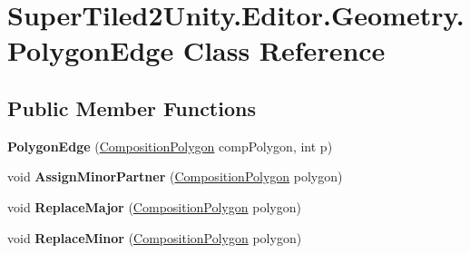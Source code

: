 \hypertarget{class_super_tiled2_unity_1_1_editor_1_1_geometry_1_1_polygon_edge}{}\section{Super\+Tiled2\+Unity.\+Editor.\+Geometry.\+Polygon\+Edge Class Reference}
\label{class_super_tiled2_unity_1_1_editor_1_1_geometry_1_1_polygon_edge}
\subsection*{Public Member Functions}
\begin{DoxyCompactItemize}
\item 
\mbox{\label{class_super_tiled2_unity_1_1_editor_1_1_geometry_1_1_polygon_edge_ad3e2a4794f2c58361280a1388a262e15}} 
{\bfseries Polygon\+Edge} (\mbox{\hyperlink{class_super_tiled2_unity_1_1_editor_1_1_geometry_1_1_composition_polygon}{Composition\+Polygon}} comp\+Polygon, int p)
\item 
\mbox{\label{class_super_tiled2_unity_1_1_editor_1_1_geometry_1_1_polygon_edge_a9852e004d9b1d5e84a38a2efadf34052}} 
void {\bfseries Assign\+Minor\+Partner} (\mbox{\hyperlink{class_super_tiled2_unity_1_1_editor_1_1_geometry_1_1_composition_polygon}{Composition\+Polygon}} polygon)
\item 
\mbox{\label{class_super_tiled2_unity_1_1_editor_1_1_geometry_1_1_polygon_edge_a8d6b56f5a1b5f9a3b5e9c552fb79fd00}} 
void {\bfseries Replace\+Major} (\mbox{\hyperlink{class_super_tiled2_unity_1_1_editor_1_1_geometry_1_1_composition_polygon}{Composition\+Polygon}} polygon)
\item 
\mbox{\label{class_super_tiled2_unity_1_1_editor_1_1_geometry_1_1_polygon_edge_ae555ce00d8389f942a50bf38d9281bd7}} 
void {\bfseries Replace\+Minor} (\mbox{\hyperlink{class_super_tiled2_unity_1_1_editor_1_1_geometry_1_1_composition_polygon}{Composition\+Polygon}} polygon)
\item 
\mbox{\label{class_super_tiled2_unity_1_1_editor_1_1_geometry_1_1_polygon_edge_a3b89fe937247c7dec9c7836194e6ea97}} 

\end{DoxyCompactItemize}
